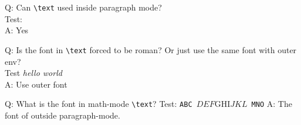 \documentclass[11pt]{revtex4-1}
\begin{document}
\noindent
Q: Can \verb+\text+ used inside paragraph mode? \\
Test:  \\
A: Yes

\noindent
Q: Is the font in \verb+\text+ forced to be roman? Or just use the same font with outer env? \\
Test \textit{hello  world} \\
A: Use outer font

\noindent
Q: What is the font in math-mode \verb+\text+?
Test: \texttt{ABC $DEF \text{GHI} JKL$ MNO}
A: The font of outside paragraph-mode.
\end{document}
